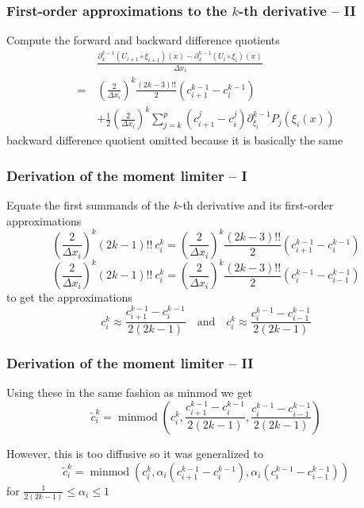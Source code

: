 \documentclass[11pt]{beamer}
\DeclareMathOperator{\minmod}{minmod}
\begin{document}
\begin{frame}
  \frametitle{First-order approximations to the $k$-th derivative -- II}
  Compute the forward and backward difference quotients
  \begin{align*}
    & \frac{\partial_{x}^{k - 1} (U_{i + 1} \circ \xi_{i + 1})(x) - \partial_{x}^{k - 1} (U_{i} \circ \xi_{i})(x)}{\Delta x_{i}}\\
    =~& \left( \frac{2}{\Delta x_{i}} \right)^{k} \frac{(2k - 3)!!}{2} (c_{i + 1}^{k - 1} - c_{i}^{k - 1})\\
    & + \frac{1}{2} \left( \frac{2}{\Delta x_{i}} \right)^{k} \sum_{j = k}^{p} (c_{i + 1}^{j} - c_{i}^{j}) \partial_{\xi_{i}}^{k - 1} P_{j}(\xi_{i}(x))
  \end{align*}
  \tiny{backward difference quotient omitted because it is basically the same}
\end{frame}

\begin{frame}
  \frametitle{Derivation of the moment limiter -- I}
  Equate the first summands of the $k$-th derivative and its first-order approximations
  \begin{equation*}
    \left( \frac{2}{\Delta x_{i}} \right)^{k} \left( 2k - 1 \right)!!~c_{i}^{k} = \left( \frac{2}{\Delta x_{i}} \right)^{k} \frac{(2k - 3)!!}{2} (c_{i + 1}^{k - 1} - c_{i}^{k - 1})
  \end{equation*}
  \begin{equation*}
    \left( \frac{2}{\Delta x_{i}} \right)^{k} \left( 2k - 1 \right)!!~c_{i}^{k} = \left( \frac{2}{\Delta x_{i}} \right)^{k} \frac{(2k - 3)!!}{2} (c_{i}^{k - 1} - c_{i - 1}^{k - 1})
  \end{equation*}
  to get the approximations
  \begin{equation*}
    c_{i}^{k} \approx \frac{c_{i + 1}^{k - 1} - c_{i}^{k - 1}}{2(2k - 1)} \quad \text{and} \quad c_{i}^{k} \approx \frac{c_{i}^{k - 1} - c_{i - 1}^{k - 1}}{2(2k - 1)}
  \end{equation*}
\end{frame}

\begin{frame}
  \frametitle{Derivation of the moment limiter -- II}
  Using these in the same fashion as minmod we get
  \begin{equation*}
    \tilde{c}_{i}^{k} = \minmod\left( c_{i}^{k}, \frac{c_{i + 1}^{k - 1} - c_{i}^{k - 1}}{2(2k - 1)}, \frac{c_{i}^{k - 1} - c_{i - 1}^{k - 1}}{2(2k - 1)} \right)
  \end{equation*}

  However, this is too diffusive so it was generalized to
  \begin{equation*}
    \tilde{c}_{i}^{k} = \minmod\left( c_{i}^{k}, \alpha_{i} \left( c_{i + 1}^{k - 1} - c_{i}^{k - 1} \right), \alpha_{i} \left( c_{i}^{k - 1} - c_{i - 1}^{k - 1} \right) \right)
  \end{equation*}
  for $\frac{1}{2(2k - 1)} \le \alpha_{i} \le 1$
\end{frame}
\end{document}
